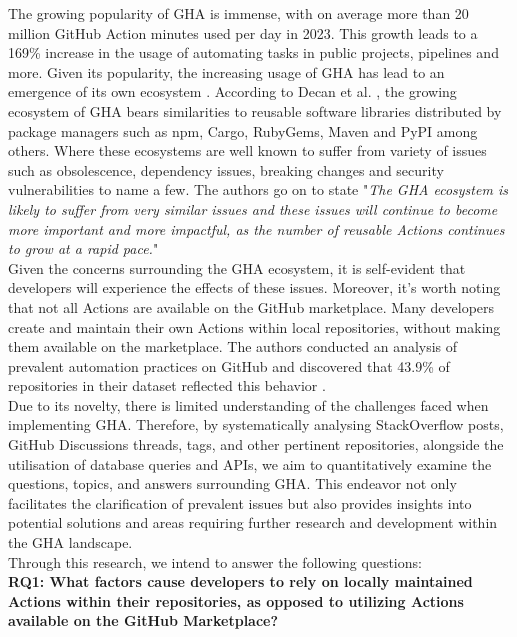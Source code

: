 \documentclass[conference]{IEEEtran}
\begin{document}
    The growing popularity of GHA is immense, with on average more than 20 million GitHub Action minutes used per day in 2023. This growth leads to a 169\% increase in the usage of automating tasks in public projects,  pipelines and more\cite{github2023octoverse}. Given its popularity,  the increasing usage of GHA has lead to an emergence of its own ecosystem \cite{decan2022use}.  According to Decan et al. \cite{decan2022use}, the growing ecosystem of GHA bears similarities to reusable software libraries distributed by package managers such as npm, Cargo, RubyGems, Maven and PyPI among others. Where these ecosystems are well known to suffer from variety of issues such as obsolescence, dependency issues, breaking changes and security vulnerabilities to name a few\cite{decan2022use}. The authors go on to state "\textit{The GHA ecosystem is likely to suffer from very similar issues and these issues will continue to become more important and more impactful, as the number of reusable Actions continues to grow at a rapid pace.}"\\

    Given the concerns surrounding the GHA ecosystem, it is self-evident that developers will experience the effects of these issues.  Moreover, it's worth noting that not all Actions are available on the GitHub marketplace. Many developers create and maintain their own Actions within local repositories, without making them available on the marketplace. The authors  conducted an analysis of prevalent automation practices on GitHub and discovered that 43.9\% of repositories in their dataset reflected this behavior \cite{decan2022use}.\\

    Due to its novelty, there is limited understanding of the challenges faced when implementing GHA.  
    Therefore,  by systematically analysing StackOverflow posts, GitHub Discussions threads, tags, and other pertinent repositories, alongside the utilisation of database queries and APIs, we aim to quantitatively examine the questions, topics, and answers surrounding GHA. This endeavor not only facilitates the clarification of prevalent issues but also provides insights into potential solutions and areas requiring further research and development within the GHA landscape.\\

    Through this research, we intend to answer the following questions:\\


    \textbf{RQ1: What factors cause developers to rely on locally maintained Actions within their repositories, as opposed to utilizing Actions available on the GitHub Marketplace?}\\
\end{document}
